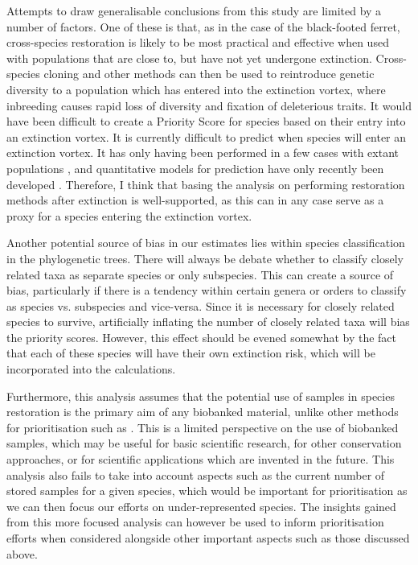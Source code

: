 \documentclass[10pt]{article}
\begin{document}
	Attempts to draw generalisable conclusions from this study are limited by a
	number of factors. One of these is that, as in the case of the black-footed
	ferret, cross-species restoration is likely to be most practical and
	effective when used with populations that are close to, but have not yet
	undergone extinction. Cross-species cloning and other methods can then be
	used to reintroduce genetic diversity to a population which has entered into
	the extinction vortex, where inbreeding causes rapid loss of diversity and
	fixation of deleterious traits. It would have been difficult to create a
	Priority Score for species based on their entry into an extinction vortex.
	It is currently difficult to predict when species
	will enter an extinction vortex. It has only having been performed in a few cases
	with extant populations \citep{williamsextinctionvortex2020}, and quantitative
	models for prediction have only recently been developed
	\citep{nabutanyiModelsEcoEvolutionaryExtinction2021}. Therefore, I think that
	basing the analysis on performing restoration methods after extinction
	is well-supported, as
	this can in any case serve as a proxy for a species entering the extinction
	vortex.
	
	Another potential source of bias in our estimates lies within species
	classification in the phylogenetic trees. There will always be debate whether
	to classify closely related taxa as separate species or only subspecies. This
	can create a source of bias, particularly if there is a tendency within certain
	genera or orders to classify as species vs. subspecies and vice-versa. Since it
	is necessary for closely related species to survive, artificially inflating the
	number of closely related taxa will bias the priority scores. However, this
	effect should be evened somewhat by the fact that each of these species will 
	have their own extinction risk, which will be incorporated into the
	calculations.
	
	Furthermore, this analysis assumes that the potential use of samples in species
	restoration is the primary aim of any biobanked material, unlike other
	methods for prioritisation such as
	\citep{harwoodDevelopingImplementingPrioritisation2021,mooneyValueExSitu2021}.
	This is a limited perspective on the use of biobanked samples, which may be
	useful for basic scientific research, for other conservation approaches, or
	for scientific applications which are invented in the future. This
	analysis also fails to take into account aspects such as the current number
	of stored samples for a given species, which would be important for
	prioritisation as we can then focus our efforts on under-represented species.
	The insights gained from this more focused analysis can however be used
	to inform prioritisation efforts when considered alongside other important
	aspects such as those discussed above.
	
\end{document}
